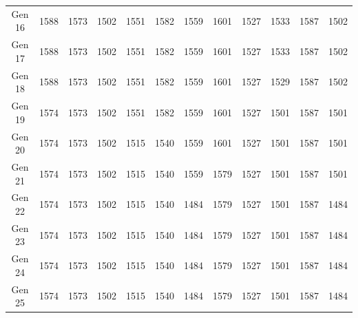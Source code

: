 \documentclass[12pt]{article}
\begin{document}
\begin{table}[h]
\begin{adjustbox}{max width=0.5\textwidth}
\begin{tabular}{*{12}{c}}
        Gen 16 & 1588 & 1573 & 1502 & 1551 & 1582 & 1559 & 1601 & 1527 & 1533 & 1587 & 1502 \\
        Gen 17 & 1588 & 1573 & 1502 & 1551 & 1582 & 1559 & 1601 & 1527 & 1533 & 1587 & 1502 \\
        Gen 18 & 1588 & 1573 & 1502 & 1551 & 1582 & 1559 & 1601 & 1527 & 1529 & 1587 & 1502 \\
        Gen 19 & 1574 & 1573 & 1502 & 1551 & 1582 & 1559 & 1601 & 1527 & 1501 & 1587 & 1501 \\
        Gen 20 & 1574 & 1573 & 1502 & 1515 & 1540 & 1559 & 1601 & 1527 & 1501 & 1587 & 1501 \\
        Gen 21 & 1574 & 1573 & 1502 & 1515 & 1540 & 1559 & 1579 & 1527 & 1501 & 1587 & 1501 \\
        Gen 22 & 1574 & 1573 & 1502 & 1515 & 1540 & 1484 & 1579 & 1527 & 1501 & 1587 & 1484 \\
        Gen 23 & 1574 & 1573 & 1502 & 1515 & 1540 & 1484 & 1579 & 1527 & 1501 & 1587 & 1484 \\
        Gen 24 & 1574 & 1573 & 1502 & 1515 & 1540 & 1484 & 1579 & 1527 & 1501 & 1587 & 1484 \\
        Gen 25 & 1574 & 1573 & 1502 & 1515 & 1540 & 1484 & 1579 & 1527 & 1501 & 1587 & 1484 \\
        \bottomrule
        \end{tabular}
    \end{adjustbox}
\end{table}
\end{document}
